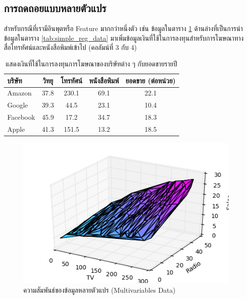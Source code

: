 \subsection{การถดถอยแบบหลายตัวแปร}
\label{sec:multi_lin_res}

สำหรับกรณีที่เรามีอินพุตหรือ Feature มากกว่าหนึ่งตัว เช่น ข้อมูลในตาราง \ref{tab:multi_reg_data} ด้านล่างที่เป็นการนำข้อมูลในตาราง 
\ref{tab:simple_reg_data} มาเพิ่มข้อมูลเงินที่ใช้ในการลงทุนสำหรับการโฆษณาทางสื่อโทรทัศน์และหนังสือพิมพ์เข้าไป (คอลัมน์ที่ 3 กับ 4) 

\begin{table}[H]
    \centering
    \caption{แสดงเงินที่ใช้ในการลงทุนการโฆษณาของบริษัทต่าง ๆ กับยอดขายรายปี}
    \label{tab:multi_reg_data}
    \small
    \begin{tabular}{lcccc}\toprule
    \textbf{บริษัท} &\textbf{วิทยุ} &\textbf{โทรทัศน์} &\textbf{หนังสือพิมพ์} &\textbf{ยอดขาย (ต่อหน่วย)} \\\midrule
    Amazon &37.8 &230.1 &69.1 &22.1 \\
    Google &39.3 &44.5 &23.1 &10.4 \\
    Facebook &45.9 &17.2 &34.7 &18.3 \\
    Apple &41.3 &151.5 &13.2 &18.5 \\
    \bottomrule
    \end{tabular}
\end{table}

\begin{figure}[H]
    \centering
    \includegraphics[width=0.8\linewidth]{fig/plot_multivar_reg.png}
    \caption{ความสัมพันธ์ของข้อมูลหลายตัวแปร (Multivariables Data)}
    \label{fig:multi_var_reg}
\end{figure}

